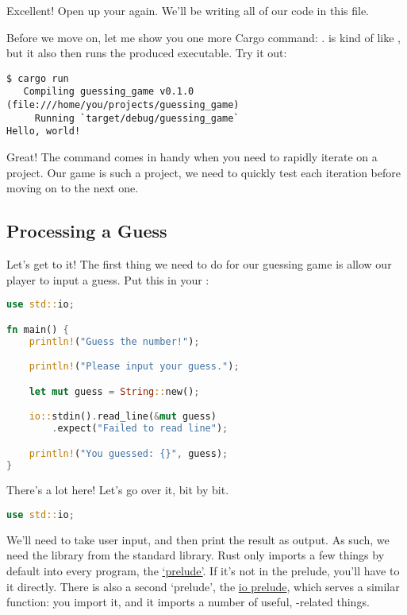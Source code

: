 Excellent! Open up your  again. We’ll be writing all of our code in this file.

\blank

Before we move on, let me show you one more Cargo command: .  is kind of like , 
but it also then runs the produced executable. Try it out:

\begin{verbatim}
$ cargo run
   Compiling guessing_game v0.1.0 (file:///home/you/projects/guessing_game)
     Running `target/debug/guessing_game`
Hello, world!
\end{verbatim}

Great! The  command comes in handy when you need to rapidly iterate on a project. Our game is such a project, we 
need to quickly test each iteration before moving on to the next one.

\subsection{Processing a Guess}

Let’s get to it! The first thing we need to do for our guessing game is allow our player to input a guess. Put this in your 
:

\begin{lstlisting}[language=Rust]
use std::io;

fn main() {
    println!("Guess the number!");

    println!("Please input your guess.");

    let mut guess = String::new();

    io::stdin().read_line(&mut guess)
        .expect("Failed to read line");

    println!("You guessed: {}", guess);
}
\end{lstlisting}

There’s a lot here! Let’s go over it, bit by bit.

\begin{lstlisting}[language=Rust]
use std::io;
\end{lstlisting}

We’ll need to take user input, and then print the result as output. As such, we need the  library from the standard 
library. Rust only imports a few things by default into every program, the \href{https://doc.rust-lang.org/std/prelude/}{‘prelude’}.
If it’s not in the prelude, you’ll have to  it directly. There is also a second ‘prelude’, the 
\href{https://doc.rust-lang.org/std/io/prelude/}{io prelude}, which serves a similar function: you import it, and it imports a 
number of useful, -related things.

